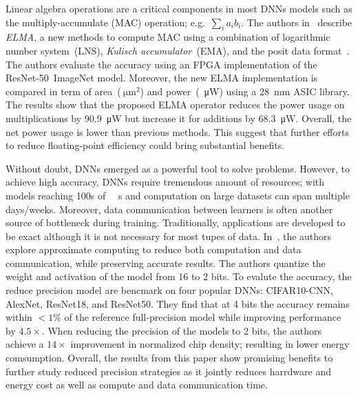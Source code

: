 Linear algebra operations are a critical components in most DNNs models such as 
the multiply-accumulate (MAC) operation; e.g.~$\sum_{i}a_{i}b_{i}$.
The authors in~\cite{Johnson2018-up} describe \textit{ELMA}, a new methods to compute MAC using a combination of logarithmic 
number system~(LNS), \textit{Kulisch accumulator}~(EMA), and the posit data format~\cite{Gustafson2017-wo}.
The authors evaluate the accuracy using an FPGA implementation of the ResNet-50~ImageNet model.
Moreover, the new ELMA implementation is compared in term of area~($\SI{}{\micro\metre}^2$)
and power~(\SI{}{\micro\watt}) using a \SI{28}{\milli\metre} ASIC library.
The results show that the proposed ELMA operator reduces the power usage on 
multiplications by \SI{90.9}{\micro\watt} but increase it for additions by \SI{68.3}{\micro\watt}.
Overall, the net power usage is lower than previous methods.
This suggest that further efforts to reduce floating-point efficiency could bring substantial benefits.

Without doubt, DNNs emerged as a powerful tool to solve problems.
However, to achieve high accuracy, DNNs require tremendous amount of resources;
with models reaching 100s of \SI{}{\mega\byte}s and computation on large datasets can span multiple days/weeks.
Moreover, data communication between learners is often another source of bottleneck during training.
Traditionally, applications are developed to be exact although it is not necessary for most tupes of data.
In~\cite{Chen2018-an}, the authors explore approximate computing to reduce both 
computation and data communication, while preserving accurate results.
The authors quantize the weight and activation of the model from 16 to 2 bits.
To evalute the accuracy, the reduce precision model are bencmark on four popular DNNs: CIFAR10-CNN, AlexNet, ResNet18, and ResNet50.
They find that at 4 bits the accuracy remains within $<1\%$ of the reference 
full-precision model while improving performance by $4.5\times$.
When reducing the precision of the models to 2 bits, the authors achieve a $14\times$
improvement in normalized chip density; resulting in lower energy comsumption.
Overall, the results from this paper show promising benefits to further study reduced 
precision strategies as it jointly reduces harrdware and energy cost as well as compute and data communication time.

